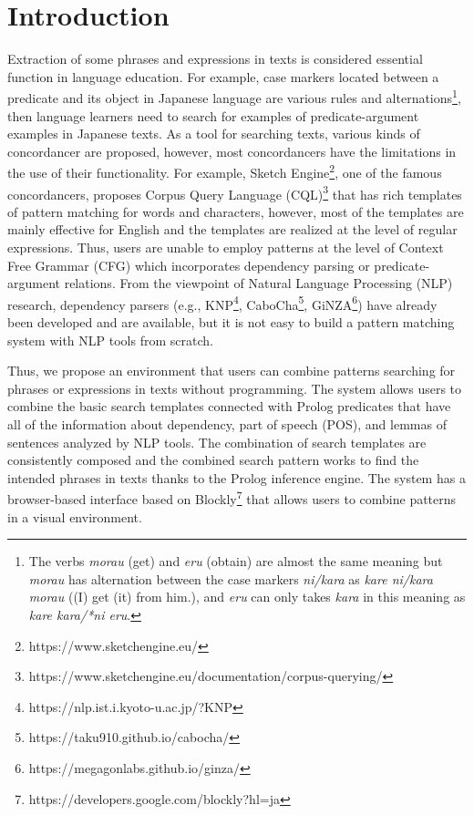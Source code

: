 \documentclass[conference]{IEEEtran}
\begin{document}
\section{Introduction}
Extraction of some phrases and expressions in texts is considered essential function in language education.
For example, case markers located between a predicate and its object in Japanese language are various
rules and alternations\footnote{The verbs {\it morau} (get) and {\it eru} (obtain) are almost the same meaning
  but {\it morau} has alternation between the case markers {\it ni/kara} as {\it kare ni/kara morau}
  ((I) get (it) from him.), and
    {\it eru} can only takes {\it kara} in this meaning as {\it kare kara/*ni eru}.},
then language learners need to search for examples of predicate-argument
examples in Japanese texts.
As a tool for searching texts, various kinds of concordancer are proposed, however,
most concordancers have the limitations in the use of their functionality.
For example, Sketch Engine\footnote{https://www.sketchengine.eu/}, one of the famous concordancers,
proposes Corpus Query Language (CQL)\footnote{https://www.sketchengine.eu/documentation/corpus-querying/}
that has rich templates of pattern matching for words and characters, however,
most of the templates are mainly effective for English and the templates are realized
at the level of regular expressions. Thus, users are unable to employ patterns at the level of Context
Free Grammar (CFG) which incorporates dependency parsing or predicate-argument relations.
From the viewpoint of Natural Language Processing (NLP) research,
dependency parsers (e.g., KNP\footnote{https://nlp.ist.i.kyoto-u.ac.jp/?KNP}, CaboCha\footnote{https://taku910.github.io/cabocha/}, GiNZA\footnote{https://megagonlabs.github.io/ginza/}) have already been developed and are available, but it is not easy to
build a pattern matching system with NLP tools from scratch.

Thus, we propose an environment that users can combine patterns
searching for phrases or expressions in texts without programming.
The system allows users to combine the basic search templates
connected with Prolog predicates that have all of the information
about dependency, part of speech (POS), and lemmas of sentences analyzed by NLP tools.
The combination of search templates are consistently composed and the
combined search pattern works to find the intended phrases in texts thanks to
the Prolog inference engine.
The system has a browser-based interface based on Blockly\footnote{https://developers.google.com/blockly?hl=ja}
that allows users to combine patterns in a visual environment.
\end{document}
